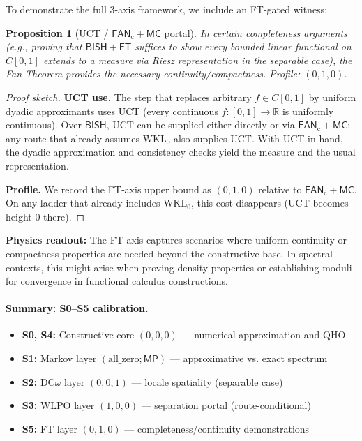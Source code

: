 \documentclass[11pt]{article}
\newcommand{\FT}{\mathsf{FT}}
\newcommand{\MP}{\mathsf{MP}}
\newcommand{\leanok}{\text{\tiny [✓ Lean]}}
\newcommand{\FTc}{\mathsf{FAN}_{\mathrm{c}}}
\newcommand{\MC}{\mathsf{MC}}
\theoremstyle{plain}
\newtheorem{proposition}[theorem]{Proposition}
\theoremstyle{definition}
\theoremstyle{remark}
\newcommand{\BISH}{\mathsf{BISH}}
\newcommand{\WKLz}{\mathrm{WKL}_0}
\newcommand{\UCT}{\mathrm{UCT}}
\begin{document}
To demonstrate the full 3-axis framework, we include an FT-gated witness:

\begin{proposition}[UCT / \(\FTc+\MC\) portal] \leanok
In certain completeness arguments (e.g., proving that $\BISH + \FT$ suffices to show every bounded linear functional on $C[0,1]$ extends to a measure via Riesz representation in the separable case), the Fan Theorem provides the necessary continuity/compactness. Profile: $(0,1,0)$.
\end{proposition}

\begin{proof}[Proof sketch]
\textbf{UCT use.} The step that replaces arbitrary \(f\in C[0,1]\) by uniform dyadic approximants
uses \(\UCT\) (every continuous \(f:[0,1]\to\mathbb{R}\) is uniformly continuous). Over \(\BISH\),
\(\UCT\) can be supplied either directly or via \(\FTc+\MC\); any route that already assumes
\(\WKLz\) also supplies \(\UCT\). With UCT in hand, the dyadic approximation and consistency
checks yield the measure and the usual representation.

\textbf{Profile.} We record the FT‑axis upper bound as \((0,1,0)\) relative to \(\FTc+\MC\). On
any ladder that already includes \(\WKLz\), this cost disappears (UCT becomes height \(0\) there).
\end{proof}

\noindent\textbf{Physics readout:} The FT axis captures scenarios where uniform continuity or compactness properties are needed beyond the constructive base. In spectral contexts, this might arise when proving density properties or establishing moduli for convergence in functional calculus constructions.

\paragraph{Summary: S0--S5 calibration.} 
\begin{itemize}
\item \textbf{S0, S4:} Constructive core $(0,0,0)$ — numerical approximation and QHO 
\item \textbf{S1:} Markov layer $(\text{all\_zero}; \MP)$ — approximative vs. exact spectrum
\item \textbf{S2:} DC$\omega$ layer $(0,0,1)$ — locale spatiality (separable case) 
\item \textbf{S3:} WLPO layer $(1,0,0)$ — separation portal (route-conditional)
\item \textbf{S5:} FT layer $(0,1,0)$ — completeness/continuity demonstrations
\end{itemize}
\end{document}
